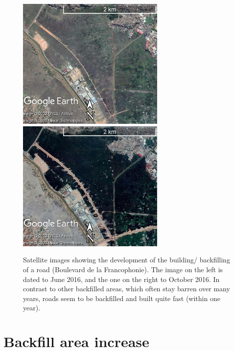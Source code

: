 \documentclass[11pt, A4, oneside]{report}
\begin{document}
\begin{figure}[H]
    \centering
    \includegraphics[width = 7.25cm]{figures/3_results/Rt_Francophonie_062016.jpg} \hspace{.25cm}
    \includegraphics[width = 7.25cm]{figures/3_results/Rt_Francophonie_102016.jpg}
    \caption{Satellite images showing the development of the building/ backfilling of a road (Boulevard de la Francophonie). The image on the left is dated to June 2016, and the one on the right to October 2016. In contrast to other backfilled areas, which often stay barren over many years, roads seem to be backfilled and built quite fast (within one year).}
    \label{fig:Rt_franco}
\end{figure}

\section{Backfill area increase}\label{sect:valid-results}
\end{document}
